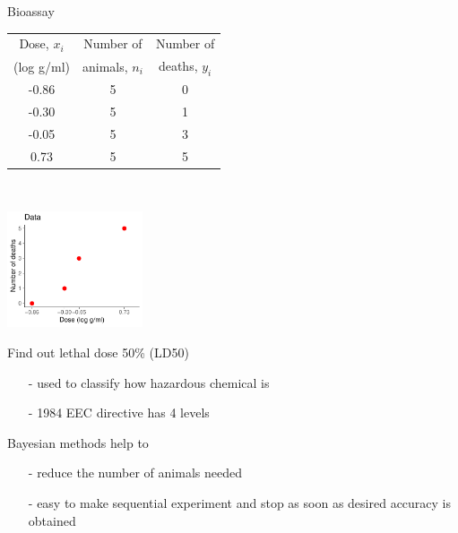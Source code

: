 \documentclass[10pt]{beamer}
\begin{document}
\begin{frame}{Bioassay}

{\footnotesize\vspace{-1mm}
    \begin{tabular}{c c c}
      \vspace{-1mm} Dose, $x_i$ & Number of & Number of \\
      (log g/ml) & animals, $n_i$ & deaths, $y_i$ \\
      \hline \vspace{-1mm}
      -0.86 & 5 & \color{red} 0 \\ \vspace{-1mm}
      -0.30 & 5 & \color{red} 1 \\ \vspace{-1mm}
      -0.05 & 5 & \color{red} 3 \\ \vspace{-1mm}
       0.73 & 5 & \color{red} 5
    \end{tabular}
  }~\parbox[t][3cm][b]{3.5cm}{\includegraphics[width=4cm]{figs/bioassay_data_small.pdf}}
  \vspace{2mm}
  \pause

  \vspace{-\baselineskip}
  Find out lethal dose 50\% (LD50)
    \begin{itemize}
      \item[-] used to classify how hazardous chemical is
      \item[-] 1984 EEC directive has 4 levels
      \end{itemize}
  \pause
   Bayesian methods help to
    \begin{itemize}
    \item[-] reduce the number of animals needed
    \item[-] easy to make sequential experiment and stop as soon as
      desired accuracy is obtained
    \end{itemize}
\end{frame}
\end{document}
